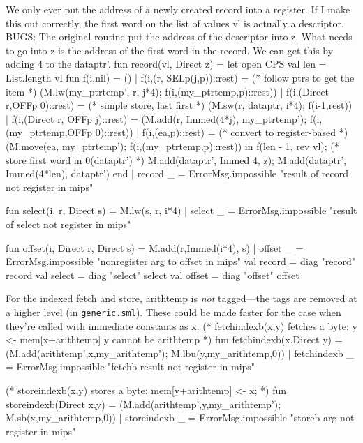 \endcode
{}
We only ever put the address of a newly created record into a register.
If I make this out correctly, the first word on the list of
values \code{}vl\edoc{} is actually a descriptor.
BUGS: The original routine put the address of the descriptor
into \code{}z\edoc{}.  
What needs to go into \code{}z\edoc{} is the address of the first word in the record.
We can get this by adding 4 to the \code{}dataptr'\edoc{}.
\enddocs
{}
\endmoddef
fun record(vl, Direct z) =
    let open CPS
        val len = List.length vl
        fun f(i,nil) = ()
          | f(i,(r, SELp(j,p))::rest) = (* follow ptrs to get the item *)
                (M.lw(my_ptrtemp', r, j*4); f(i,(my_ptrtemp,p)::rest))
          | f(i,(Direct r,OFFp 0)::rest) =  (* simple store, last first *) 
                (M.sw(r, dataptr, i*4); f(i-1,rest))
          | f(i,(Direct r, OFFp j)::rest) = 
                (M.add(r, Immed(4*j), my_ptrtemp'); 
                                f(i,(my_ptrtemp,OFFp 0)::rest))
          | f(i,(ea,p)::rest) = (* convert to register-based *)
                (M.move(ea, my_ptrtemp'); f(i,(my_ptrtemp,p)::rest))
      in f(len - 1, rev vl); (* store first word in \code{}0(dataptr')\edoc{} *)
         M.add(dataptr', Immed 4, z);
         M.add(dataptr', Immed(4*len), dataptr')
     end
   | record _ = ErrorMsg.impossible "result of record not register in mips"

fun select(i, r, Direct s) = M.lw(s, r, i*4)
  | select _ = ErrorMsg.impossible "result of select not register in mips"

fun offset(i, Direct r, Direct s) = M.add(r,Immed(i*4), s)
  | offset _ = ErrorMsg.impossible "nonregister arg to offset in mips"
\endcode
{}
\endmoddef
val record = diag "record" record
val select = diag "select" select
val offset = diag "offset" offset

\endcode
{}
For the indexed fetch and store, arithtemp is {\em not} tagged---the
tags are removed at a higher level (in {\tt generic.sml}).
These could be made faster for the case when they're called with immediate
constants as \code{}x\edoc{}.
\enddocs
{}
\endmoddef
(* fetchindexb(x,y) fetches a byte: y <- mem[x+arithtemp]
        y cannot be arithtemp *)
fun fetchindexb(x,Direct y) =
    (M.add(arithtemp',x,my_arithtemp');    
     M.lbu(y,my_arithtemp,0))
  | fetchindexb _ = ErrorMsg.impossible "fetchb result not register in mips"

(* storeindexb(x,y) stores a byte: mem[y+arithtemp] <- x; *)
fun storeindexb(Direct x,y) =
    (M.add(arithtemp',y,my_arithtemp');
     M.sb(x,my_arithtemp,0))
  | storeindexb _ = ErrorMsg.impossible "storeb arg not register in mips"

